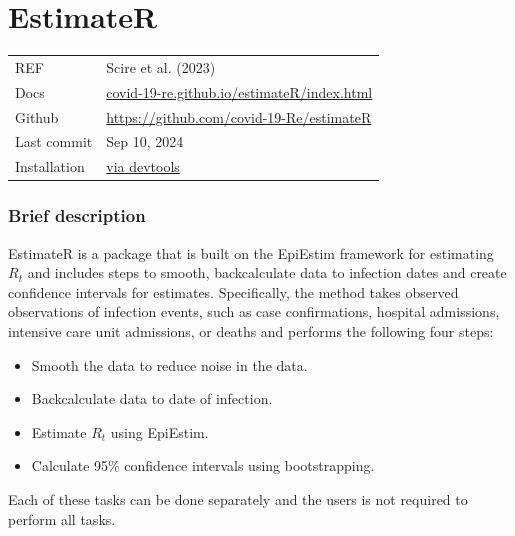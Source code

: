 \documentclass[
  letterpaper,
  DIV=11,
  numbers=noendperiod]{scrreprt}
\providecommand{\tightlist}{%
  \setlength{\itemsep}{0pt}\setlength{\parskip}{0pt}}\usepackage{longtable,booktabs,array}
\begin{document}
\chapter*{EstimateR}\label{estimater}


\begin{longtable}[]{@{}
  >{\raggedright\arraybackslash}p{}
  >{\raggedright\arraybackslash}p{}@{}}
\toprule\noalign{}
\endhead
\bottomrule\noalign{}
\endlastfoot
REF & Scire et al. (2023) \\
Docs &
\href{https://covid-19-re.github.io/estimateR/index.html}{covid-19-re.github.io/estimateR/index.html} \\
Github & \url{https://github.com/covid-19-Re/estimateR} \\
Last commit & Sep 10, 2024 \\
Installation & \href{https://github.com/covid-19-Re/estimateR}{via
devtools} \\
\end{longtable}

\subsection*{Brief description}\label{brief-description-11}

EstimateR is a package that is built on the EpiEstim framework for
estimating \(R_t\) and includes steps to smooth, backcalculate data to
infection dates and create confidence intervals for estimates.
Specifically, the method takes observed observations of infection
events, such as case confirmations, hospital admissions, intensive care
unit admissions, or deaths and performs the following four steps:

\begin{itemize}
\tightlist
\item
  Smooth the data to reduce noise in the data.
\item
  Backcalculate data to date of infection.
\item
  Estimate \(R_t\) using EpiEstim.
\item
  Calculate 95\% confidence intervals using bootstrapping.
\end{itemize}

Each of these tasks can be done separately and the users is not required
to perform all tasks.
\end{document}
